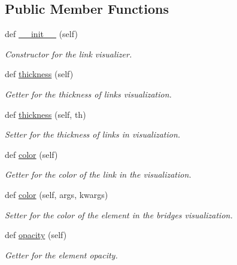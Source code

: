 \subsection*{Public Member Functions}
\begin{DoxyCompactItemize}
\item 
def \mbox{\hyperlink{classbridges_1_1link__visualizer_1_1_link_visualizer_a9994004a7808bdcaa6f18ebfd9b7717a}{\+\_\+\+\_\+init\+\_\+\+\_\+}} (self)
\begin{DoxyCompactList}\small\item\em Constructor for the link visualizer\textquotesingle{}. \end{DoxyCompactList}\item 
def \mbox{\hyperlink{classbridges_1_1link__visualizer_1_1_link_visualizer_a4a89f95ecc6623ba17d2c47d7425c05b}{thickness}} (self)
\begin{DoxyCompactList}\small\item\em Getter for the thickness of links visualization. \end{DoxyCompactList}\item 
def \mbox{\hyperlink{classbridges_1_1link__visualizer_1_1_link_visualizer_af244bbe99885785f7dd3bb9460c1d21a}{thickness}} (self, th)
\begin{DoxyCompactList}\small\item\em Setter for the thickness of links in visualization. \end{DoxyCompactList}\item 
def \mbox{\hyperlink{classbridges_1_1link__visualizer_1_1_link_visualizer_ad87b36af48a35e41c9cad10239b4f7fb}{color}} (self)
\begin{DoxyCompactList}\small\item\em Getter for the color of the link in the visualization. \end{DoxyCompactList}\item 
def \mbox{\hyperlink{classbridges_1_1link__visualizer_1_1_link_visualizer_a3ae57af9d642648e0a581fd578084e08}{color}} (self, args, kwargs)
\begin{DoxyCompactList}\small\item\em Setter for the color of the element in the bridges visualization. \end{DoxyCompactList}\item 
def \mbox{\hyperlink{classbridges_1_1link__visualizer_1_1_link_visualizer_a777892e054f00e8ef0291c5d41ce7f75}{opacity}} (self)
\begin{DoxyCompactList}\small\item\em Getter for the element opacity. \end{DoxyCompactList}\item 

\end{DoxyCompactItemize}
